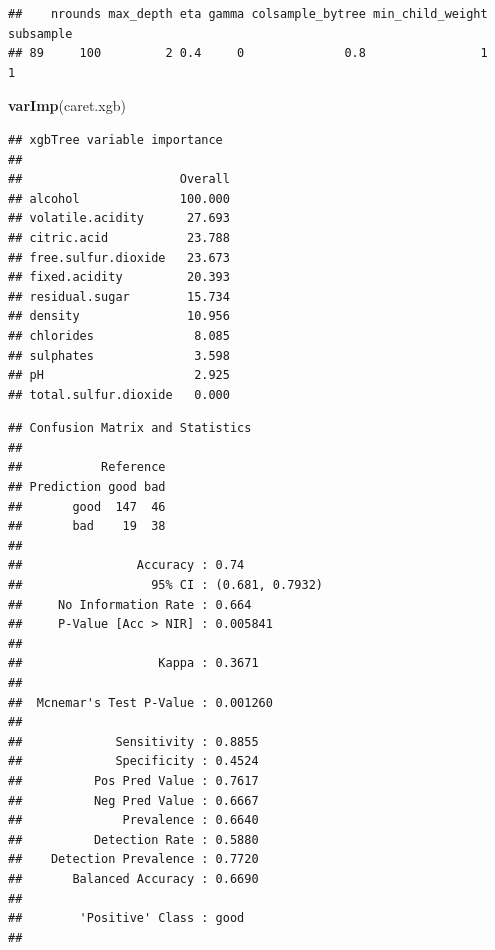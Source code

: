 \documentclass[
]{book}
\newenvironment{Shaded}{\begin{snugshade}}{\end{snugshade}}
\newcommand{\DataTypeTok}[1]{\textcolor[rgb]{0.13,0.29,0.53}{#1}}
\newcommand{\KeywordTok}[1]{\textcolor[rgb]{0.13,0.29,0.53}{\textbf{#1}}}
\newcommand{\NormalTok}[1]{#1}
\newcommand{\OperatorTok}[1]{\textcolor[rgb]{0.81,0.36,0.00}{\textbf{#1}}}
\theoremstyle{break}
\theoremstyle{definition}
\theoremstyle{definition}
\theoremstyle{definition}
\theoremstyle{remark}
\begin{document}
\begin{verbatim}
##    nrounds max_depth eta gamma colsample_bytree min_child_weight subsample
## 89     100         2 0.4     0              0.8                1         1
\end{verbatim}

\begin{Shaded}
\begin{Highlighting}[]
\KeywordTok{varImp}\NormalTok{(caret.xgb)}
\end{Highlighting}
\end{Shaded}

\begin{verbatim}
## xgbTree variable importance
## 
##                      Overall
## alcohol              100.000
## volatile.acidity      27.693
## citric.acid           23.788
## free.sulfur.dioxide   23.673
## fixed.acidity         20.393
## residual.sugar        15.734
## density               10.956
## chlorides              8.085
## sulphates              3.598
## pH                     2.925
## total.sulfur.dioxide   0.000
\end{verbatim}

\begin{Shaded}
\end{Shaded}

\begin{verbatim}
## Confusion Matrix and Statistics
## 
##           Reference
## Prediction good bad
##       good  147  46
##       bad    19  38
##                                          
##                Accuracy : 0.74           
##                  95% CI : (0.681, 0.7932)
##     No Information Rate : 0.664          
##     P-Value [Acc > NIR] : 0.005841       
##                                          
##                   Kappa : 0.3671         
##                                          
##  Mcnemar's Test P-Value : 0.001260       
##                                          
##             Sensitivity : 0.8855         
##             Specificity : 0.4524         
##          Pos Pred Value : 0.7617         
##          Neg Pred Value : 0.6667         
##              Prevalence : 0.6640         
##          Detection Rate : 0.5880         
##    Detection Prevalence : 0.7720         
##       Balanced Accuracy : 0.6690         
##                                          
##        'Positive' Class : good           
## 
\end{verbatim}
\end{document}
